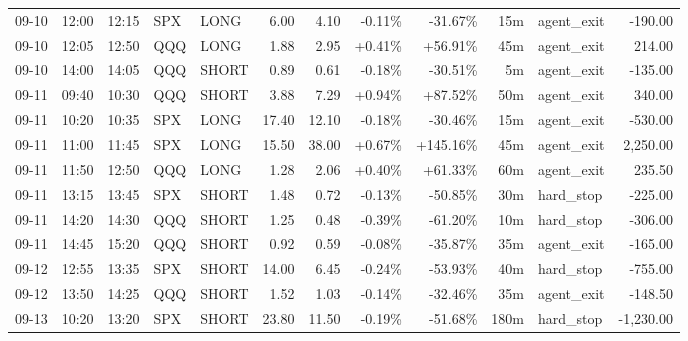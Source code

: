 \documentclass[11pt,a4paper,twoside]{article}
\begin{document}
\begin{center}
\begin{longtable}{>{\color{txtmain}}l l l l l r r r r r >{\color{txtmain}}l r}
09-10 & 12:00 & 12:15 & SPX & LONG & 6.00 & 4.10 & \textcolor{lossred}{-0.11\%} & \textcolor{lossred}{-31.67\%} & 15m & agent\_exit & \textcolor{lossred}{-190.00} \\
09-10 & 12:05 & 12:50 & QQQ & LONG & 1.88 & 2.95 & \textcolor{wingreen}{+0.41\%} & \textcolor{wingreen}{+56.91\%} & 45m & agent\_exit & \textcolor{wingreen}{214.00} \\
09-10 & 14:00 & 14:05 & QQQ & SHORT & 0.89 & 0.61 & \textcolor{lossred}{-0.18\%} & \textcolor{lossred}{-30.51\%} & 5m & agent\_exit & \textcolor{lossred}{-135.00} \\
09-11 & 09:40 & 10:30 & QQQ & SHORT & 3.88 & 7.29 & \textcolor{wingreen}{+0.94\%} & \textcolor{wingreen}{+87.52\%} & 50m & agent\_exit & \textcolor{wingreen}{340.00} \\
09-11 & 10:20 & 10:35 & SPX & LONG & 17.40 & 12.10 & \textcolor{lossred}{-0.18\%} & \textcolor{lossred}{-30.46\%} & 15m & agent\_exit & \textcolor{lossred}{-530.00} \\
09-11 & 11:00 & 11:45 & SPX & LONG & 15.50 & 38.00 & \textcolor{wingreen}{+0.67\%} & \textcolor{wingreen}{+145.16\%} & 45m & agent\_exit & \textcolor{wingreen}{2,250.00} \\
09-11 & 11:50 & 12:50 & QQQ & LONG & 1.28 & 2.06 & \textcolor{wingreen}{+0.40\%} & \textcolor{wingreen}{+61.33\%} & 60m & agent\_exit & \textcolor{wingreen}{235.50} \\
09-11 & 13:15 & 13:45 & SPX & SHORT & 1.48 & 0.72 & \textcolor{lossred}{-0.13\%} & \textcolor{lossred}{-50.85\%} & 30m & hard\_stop & \textcolor{lossred}{-225.00} \\
09-11 & 14:20 & 14:30 & QQQ & SHORT & 1.25 & 0.48 & \textcolor{lossred}{-0.39\%} & \textcolor{lossred}{-61.20\%} & 10m & hard\_stop & \textcolor{lossred}{-306.00} \\
09-11 & 14:45 & 15:20 & QQQ & SHORT & 0.92 & 0.59 & \textcolor{lossred}{-0.08\%} & \textcolor{lossred}{-35.87\%} & 35m & agent\_exit & \textcolor{lossred}{-165.00} \\
09-12 & 12:55 & 13:35 & SPX & SHORT & 14.00 & 6.45 & \textcolor{lossred}{-0.24\%} & \textcolor{lossred}{-53.93\%} & 40m & hard\_stop & \textcolor{lossred}{-755.00} \\
09-12 & 13:50 & 14:25 & QQQ & SHORT & 1.52 & 1.03 & \textcolor{lossred}{-0.14\%} & \textcolor{lossred}{-32.46\%} & 35m & agent\_exit & \textcolor{lossred}{-148.50} \\
09-13 & 10:20 & 13:20 & SPX & SHORT & 23.80 & 11.50 & \textcolor{lossred}{-0.19\%} & \textcolor{lossred}{-51.68\%} & 180m & hard\_stop & \textcolor{lossred}{-1,230.00} \\

\end{longtable}
\end{center}
\end{document}
